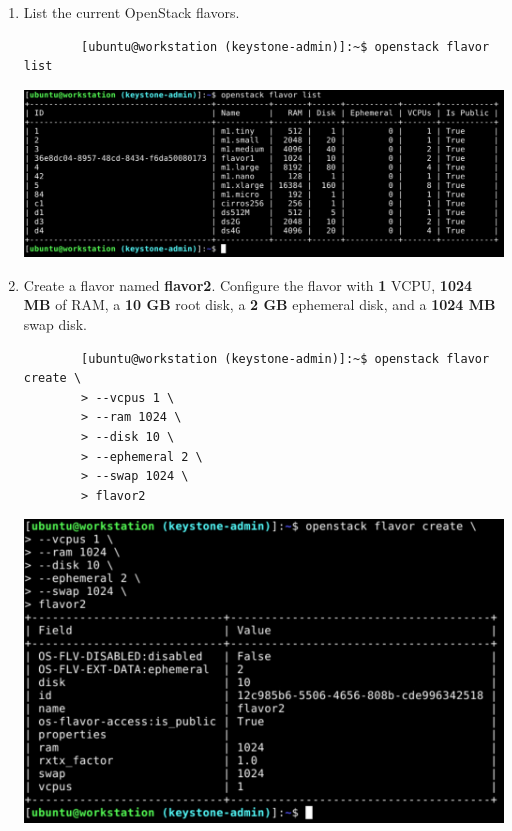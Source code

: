 \documentclass[letterpaper, 12pt]{article}
\begin{document}
\begin{enumerate}
    \item List the current OpenStack flavors.
    \begin{lstlisting}
        [ubuntu@workstation (keystone-admin)]:~$ openstack flavor list
    \end{lstlisting}

    \begin{center}
        \includegraphics[width=\linewidth]{images/part2/step7.png}
    \end{center}

    \item Create a flavor named \textbf{flavor2}. Configure the flavor with \textbf{1} VCPU, \textbf{1024 MB} of RAM, a
    \textbf{10 GB} root disk, a \textbf{2 GB} ephemeral disk, and a \textbf{1024 MB} swap disk.
    \begin{lstlisting}
        [ubuntu@workstation (keystone-admin)]:~$ openstack flavor create \
        > --vcpus 1 \
        > --ram 1024 \
        > --disk 10 \
        > --ephemeral 2 \
        > --swap 1024 \
        > flavor2
    \end{lstlisting}

    \begin{center}
        \includegraphics[width=\linewidth]{images/part2/step8.png}
    \end{center}


\end{enumerate}
\end{document}
